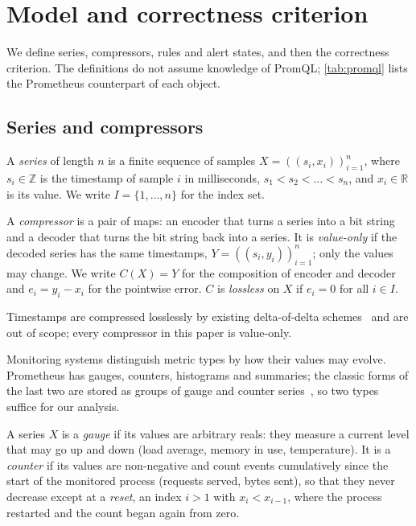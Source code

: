 \section{Model and correctness criterion}
\label{sec:model}

We define series, compressors, rules and alert states, and then the
correctness criterion. The definitions do not assume knowledge of PromQL;
\cref{tab:promql} lists the Prometheus counterpart of each object.

\subsection{Series and compressors}

\begin{definition}[Series]
\label{def:series}
A \emph{series} of length $n$ is a finite sequence of samples
$X = ((s_i, x_i))_{i=1}^{n}$, where $s_i \in \mathbb{Z}$ is the timestamp
of sample $i$ in milliseconds, $s_1 < s_2 < \dots < s_n$, and
$x_i \in \mathbb{R}$ is its value. We write $I = \{1, \dots, n\}$ for the
index set.
\end{definition}

\begin{definition}
\label{def:compressor}
A \emph{compressor} is a pair of maps: an encoder that turns a series into
a bit string and a decoder that turns the bit string back into a series. It
is \emph{value-only} if the decoded series has the same timestamps,
$Y = ((s_i, y_i))_{i=1}^{n}$; only the values may change. We write
$C(X) = Y$ for the composition of encoder and decoder and
$e_i = y_i - x_i$ for the pointwise error. $C$ is \emph{lossless} on $X$ if
$e_i = 0$ for all $i \in I$.
\end{definition}

Timestamps are compressed losslessly by existing delta-of-delta
schemes~\cite{pelkonen2015gorilla} and are out of scope; every compressor in
this paper is value-only.

Monitoring systems distinguish metric types by how their values may evolve.
Prometheus has gauges, counters, histograms and summaries; the classic
forms of the last two are stored as groups of gauge and counter
series~\cite{prometheus}, so two types suffice for our analysis.

\begin{definition}
\label{def:kinds}
A series $X$ is a \emph{gauge} if its values are arbitrary reals: they
measure a current level that may go up and down (load average, memory in
use, temperature). It is a \emph{counter} if its values are non-negative
and count events cumulatively since the start of the monitored process
(requests served, bytes sent), so that they never decrease except at a
\emph{reset}, an index $i > 1$ with $x_i < x_{i-1}$, where the process
restarted and the count began again from zero.
\end{definition}

